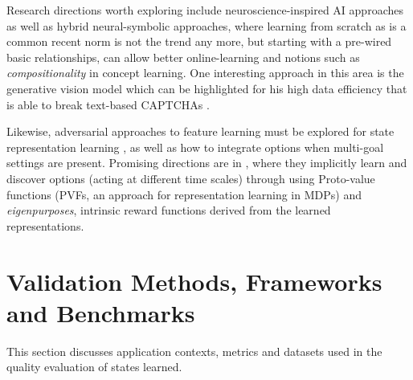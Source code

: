 \documentclass[a4paper]{article}
\begin{document}
Research directions worth exploring include neuroscience-inspired AI \cite{Hassabis17} approaches as well as hybrid neural-symbolic \cite{Garnelo16} approaches, where learning from scratch as is a common recent norm is not the trend any more, but starting with a pre-wired basic relationships, can allow better online-learning and notions such as \textit{compositionality} in concept learning. One interesting approach in this area is the generative vision model which can be highlighted for his high data efficiency that is able to break text-based CAPTCHAs \cite{George17}. %

Likewise, adversarial approaches to feature learning must be explored for state representation learning \cite{Donahue16}, as well as how to integrate options when multi-goal settings are present. Promising directions are in \cite{Machado17a}, where they implicitly learn and discover options (acting at different time scales) through using Proto-value functions (PVFs, an approach for representation learning in MDPs) and \textit{eigenpurposes}, intrinsic reward functions derived from the learned representations. %

\section{Validation Methods, Frameworks and Benchmarks}
This section discusses application contexts, metrics and datasets used in the quality evaluation of states learned. 

\end{document}
